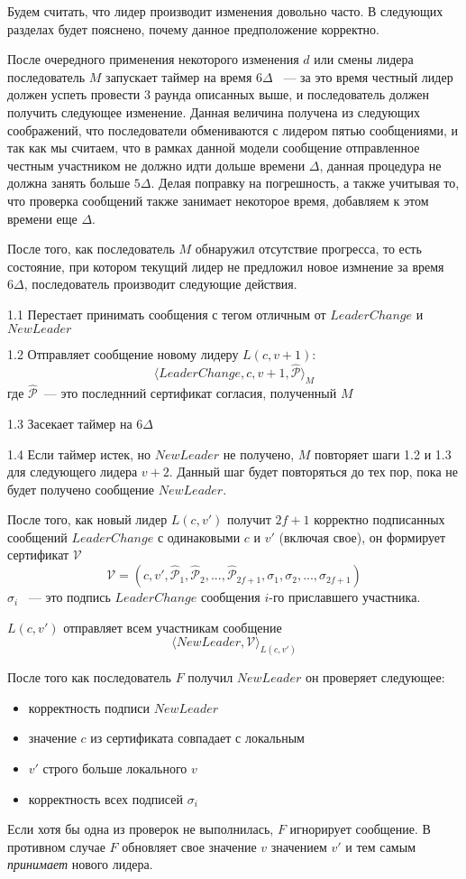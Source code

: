 Будем считать, что лидер производит изменения довольно часто. В следующих разделах будет пояснено, почему данное предположение корректно.

После очередного применения некоторого изменения $d$ или смены лидера последователь $M$ запускает таймер на время $6\Delta$ ~--- за это время честный лидер должен успеть провести 3 раунда описанных выше, и последователь должен получить следующее изменение.
Данная величина получена из следующих соображений, что последователи обмениваются с лидером пятью сообщениями, и так как мы считаем, что в рамках данной модели сообщение отправленное честным участником не должно идти дольше времени $\Delta$, данная процедура не должна занять больше $5\Delta$. Делая поправку на погрешность, а также учитывая то, что проверка сообщений также занимает некоторое время, добавляем к этом времени еще $\Delta$.

После того, как последователь $M$ обнаружил отсутствие прогресса, то есть состояние, при котором текущий лидер не предложил новое измнение за время $6\Delta$, последователь производит следующие действия.

1.1 Перестает принимать сообщения с тегом отличным от $LeaderChange$ и $NewLeader$

1.2 Отправляет сообщение новому лидеру $L(c, v+1)$:
\[ \langle LeaderChange, c, v+1,  \hat{\mathcal{P}} \rangle_M \]
где $\hat{\mathcal{P}}$~--- это последнний сертификат согласия, полученный $M$

1.3 Засекает таймер на $6\Delta$

1.4 Если таймер истек, но $NewLeader$ не получено, $M$ повторяет шаги 1.2 и 1.3 для следующего лидера $v+2$. Данный шаг будет повторяться до тех пор, пока не будет получено сообщение $NewLeader$.
\vspace{10pt}

После того, как новый лидер $L(c, v')$ получит $2f+1$ корректно подписанных сообщений $LeaderChange$ с одинаковыми $c$ и $v'$  (включая свое), он формирует сертификат $\mathcal{V}$
$$\mathcal{V}=(c, v', \hat{\mathcal{P}}_1, \hat{\mathcal{P}}_2,...,\hat{\mathcal{P}}_{2f+1}, \sigma_1, \sigma_2,..., \sigma_{2f+1})$$ 
$\sigma_i$ ~--- это подпись $LeaderChange$ сообщения $i$-го приславшего участника.

$L(c, v')$ отправляет всем участникам сообщение
\[ \langle NewLeader, \mathcal{V} \rangle_{L(c, v')} \]

После того как последователь $F$ получил $NewLeader$ он проверяет следующее:
\begin{itemize}
\item корректность подписи $NewLeader$
\item значение $c$ из сертификата совпадает с локальным
\item $v'$ строго больше локального $v$
\item корректность всех подписей $\sigma_i$
\end{itemize}
Если хотя бы одна из проверок не выполнилась, $F$ игнорирует сообщение. В противном случае $F$ обновляет свое значение $v$ значением $v'$ и тем самым \textit{принимает} нового лидера.
\vspace{10pt}

